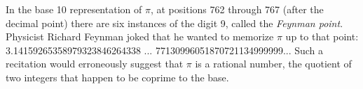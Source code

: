 \documentclass[12pt]{article}
\begin{document}
In the base 10 representation of $\pi$, at positions 762 through 767 (after the decimal point) there are six instances of the digit 9, called the {\em Feynman point}. Physicist Richard Feynman joked that he wanted to memorize $\pi$ up to that point: 3.14159265358979323846264338 ... 77130996051870721134999999... Such a recitation would erroneously suggest that $\pi$ is a rational number, the quotient of two integers that happen to be coprime to the base.
\end{document}
